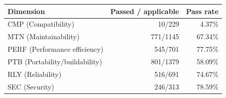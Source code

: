 \begin{tabular}{lrr}
\toprule
Dimension & Passed / applicable & Pass rate \\
\midrule
CMP (Compatibility) & 10/229 & 4.37\% \\
MTN (Maintainability) & 771/1145 & 67.34\% \\
PERF (Performance efficiency) & 545/701 & 77.75\% \\
PTB (Portability/buildability) & 801/1379 & 58.09\% \\
RLY (Reliability) & 516/691 & 74.67\% \\
SEC (Security) & 246/313 & 78.59\% \\
\bottomrule
\end{tabular}
